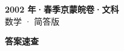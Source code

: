\documentclass[zihao=-4, a4paper]{ctexart}
\begin{document}
\begin{center}
  {\Large\bfseries 2002 年·春季京蒙皖卷·文科}\\[4pt]
  {\large 数学 · 简答版}
\end{center}
\medskip
{}

\clearpage
{}
\begin{center}{\Large\bfseries 答案速查}\end{center}
\medskip

\end{document}
